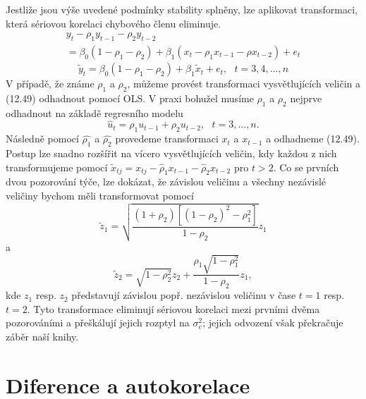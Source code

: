 Jestliže jsou výše uvedené podmínky stability splněny, lze aplikovat transformaci, která sériovou korelaci chybového členu eliminuje.
\begin{multline}
y_t - \rho_1 y_{t - 1} - \rho_2 y_{t - 2}\\
= \beta_0(1 - \rho_1 - \rho_2) + \beta_1 (x_t - \rho_1 x_{t - 1} - \rho x_{t - 2}) + e_t
\end{multline}
\begin{equation}
\tilde{y}_t = \beta_0(1 - \rho_1 - \rho_2) + \beta_1 \tilde{x}_t + e_t, ~~~ t = 3, 4, ..., n
\end{equation}
V případě, že známe $\rho_1$ a $\rho_2$, můžeme provést transformaci vysvětlujících veličin a (12.49) odhadnout pomocí OLS. V praxi bohužel musíme $\rho_1$ a $\rho_2$ nejprve odhadnout na základě regresního modelu
\begin{equation}
\hat{u}_t = \rho_1 u_{t - 1} + \rho_2 u_{t - 2}, ~~~ t = 3, ..., n.
\end{equation}
Následně pomocí $\hat{\rho_1}$ a $\hat{\rho_2}$ provedeme transformaci $x_t$ a $x_{t - 1}$ a odhadneme (12.49). Postup lze snadno rozšířit na vícero vysvětlujících veličin, kdy každou z nich transformujeme pomocí $\tilde{x}_{tj} = x_{tj} - \hat{\rho}_1 x_{t - 1} - \hat{\rho}_2 x_{t - 2}$ pro $t > 2$. Co se prvních dvou pozorování týče, lze dokázat, že závislou veličinu a všechny nezávislé veličiny bychom měli transformovat pomocí
\begin{equation}
\tilde{z}_1 = \sqrt{\frac{(1 + \rho_2)[(1 - \rho_2)^2 - \rho_1^2]}{1 - \rho_2}}z_1
\end{equation} 
a
\begin{equation}
\tilde{z}_2 = \sqrt{1 - \rho_2^2}z_2 + \frac{\rho_1 \sqrt{1 - \rho_1^2}}{1 - \rho_2}z_1,
\end{equation}
kde $z_1$ resp. $z_2$ představují závislou popř. nezávislou veličinu v čase $t = 1$ resp. $t = 2$. Tyto transformace eliminují sériovou korelaci mezi prvními dvěma pozorováními a přeškálují jejich rozptyl na $\sigma^2_e$; jejich odvození však překračuje záběr naší knihy.

\section{Diference a autokorelace}

